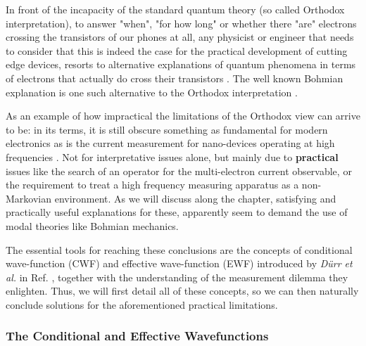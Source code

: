 \documentclass[11pt, a4paper]{article} %
\begin{document}
\newpage
{}
\setcounter{page}{1}

\hspace*{4mm} In front of the incapacity of the standard quantum theory (so called Orthodox interpretation), to answer "when", "for how long" or whether there "are" electrons crossing the transistors of our phones at all, any physicist or engineer that needs to consider that this is indeed the case for the practical development of cutting edge devices, resorts to alternative explanations of quantum phenomena in terms of electrons that actually do cross their transistors \cite{where}. The well known Bohmian explanation is one such alternative to the Orthodox interpretation \cite{Bohm,Holland, Durr,JordiXavier}. 

As an example of how impractical the limitations of the Orthodox view can arrive to be: in its terms, it is still obscure something as fundamental for modern electronics as is the current measurement for nano-devices operating at high frequencies \cite{Thz}. Not for interpretative issues alone, but mainly due to {\bf practical} issues like the search of an operator for the multi-electron current observable, or the requirement to treat a high frequency measuring apparatus as a non-Markovian environment. As we will discuss along the chapter, satisfying and practically useful explanations for these, apparently seem to demand the use of modal theories like Bohmian mechanics. 

The essential tools for reaching these conclusions are the concepts of conditional wave-function (CWF) and effective wave-function (EWF) introduced by {\em Dürr et al.} in Ref. \cite{Absolute}, together with the understanding of the measurement dilemma they enlighten. Thus, we will first detail all of these concepts, so we can then naturally conclude solutions for the aforementioned practical limitations.
\vspace{-0.2cm}

\subsubsection*{The Conditional and Effective Wavefunctions}
\vspace{-0.2cm}
\end{document}
